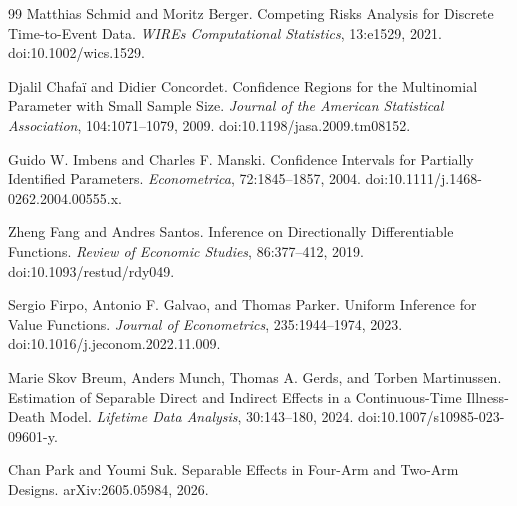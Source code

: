 \documentclass{article}
\begin{document}
\begin{thebibliography}{99}
   Matthias Schmid and Moritz Berger. Competing Risks Analysis for Discrete Time-to-Event Data. \emph{WIREs Computational Statistics}, 13:e1529, 2021. doi:10.1002/wics.1529.

   Djalil Chafaï and Didier Concordet. Confidence Regions for the Multinomial Parameter with Small Sample Size. \emph{Journal of the American Statistical Association}, 104:1071--1079, 2009. doi:10.1198/jasa.2009.tm08152.

   Guido W. Imbens and Charles F. Manski. Confidence Intervals for Partially Identified Parameters. \emph{Econometrica}, 72:1845--1857, 2004. doi:10.1111/j.1468-0262.2004.00555.x.

   Zheng Fang and Andres Santos. Inference on Directionally Differentiable Functions. \emph{Review of Economic Studies}, 86:377--412, 2019. doi:10.1093/restud/rdy049.

   Sergio Firpo, Antonio F. Galvao, and Thomas Parker. Uniform Inference for Value Functions. \emph{Journal of Econometrics}, 235:1944--1974, 2023. doi:10.1016/j.jeconom.2022.11.009.

   Marie Skov Breum, Anders Munch, Thomas A. Gerds, and Torben Martinussen. Estimation of Separable Direct and Indirect Effects in a Continuous-Time Illness-Death Model. \emph{Lifetime Data Analysis}, 30:143--180, 2024. doi:10.1007/s10985-023-09601-y.

   Chan Park and Youmi Suk. Separable Effects in Four-Arm and Two-Arm Designs. arXiv:2605.05984, 2026.

\end{thebibliography}
\end{document}
